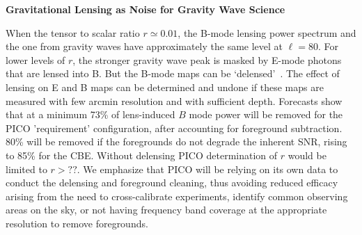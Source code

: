 \documentclass[PICOReport.tex]{subfiles}
\begin{document}

{\bf Gravitational Lensing as Noise for Gravity Wave Science}

When the tensor to scalar ratio $r \simeq 0.01$, the B-mode lensing power spectrum and the one from gravity waves have approximately 
the same level at $\ell = 80$. For lower levels of $r$, the stronger gravity wave peak is masked by E-mode photons that are lensed into B. 
But the B-mode maps can be `delensed'~\cite{??}. The effect of lensing on E and B maps can be determined and undone if these maps are 
measured with few arcmin resolution and with sufficient depth. Forecasts show that at a minimum 73\% of lens-induced $B$ mode power will 
be removed for the PICO 'requirement' configuration, after accounting for foreground subtraction. 80\% will be removed if the foregrounds 
do not degrade the inherent SNR, rising to 85\% for the CBE. Without delensing PICO determination of $r$ would be limited to $r>??$. 
We emphasize that PICO will be relying on its own data to conduct the delensing and foreground cleaning, thus avoiding reduced efficacy arising 
from the need to cross-calibrate experiments, identify common observing areas on the sky, or not having frequency band coverage at the appropriate resolution to remove foregrounds. 
\end{document}
